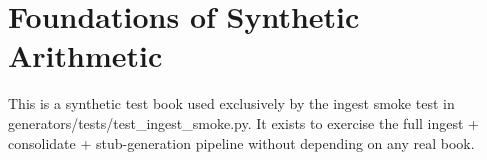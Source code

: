 \chapter{Foundations of Synthetic Arithmetic}
\label{ch:synth-arith}

This is a synthetic test book used exclusively by the ingest smoke test
in generators/tests/test_ingest_smoke.py. It exists to exercise the full
ingest + consolidate + stub-generation pipeline without depending on any
real book.
